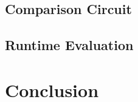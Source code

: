 \documentclass[12pt,twoside]{reedthesis}
\begin{document}
    \section{Comparison Circuit}
    \section{Runtime Evaluation}
    
    
    \chapter{Conclusion} 
    
    
    
    

 

\end{document}
